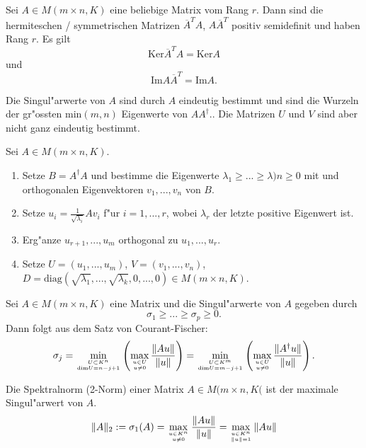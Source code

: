 \documentclass[9pt, a4paper, twocolumn, landscape]{article}
\begin{document}
\begin{lemma}
Sei $A \in M (m \times n, K)$ eine beliebige Matrix vom Rang $r$. Dann sind die hermiteschen / symmetrischen Matrizen $\overline{A}^T A$, $A\overline{A}^T$ positiv semidefinit und haben Rang $r$. Es gilt
$$
\mathrm{Ker} \overline{A}^T A = \mathrm{Ker} A
$$
und
$$
\mathrm{Im} A \overline{A}^T = \mathrm{Im} A.
$$
\end{lemma}



\begin{remark}
Die Singul"arwerte von $A$ sind durch $A$ eindeutig bestimmt und sind die Wurzeln der gr"ossten $\mathrm{min}(m, n)$ Eigenwerte von $AA^\dagger$.. Die Matrizen $U$ und $V$ sind aber nicht ganz eindeutig bestimmt.
\end{remark}

\begin{remark} 
Sei $A \in M(m \times n, K)$.
\begin{enumerate}
\item Setze $B = A^\dagger A$ und bestimme die Eigenwerte $\lambda_1 \geq ... \geq \lambda)n \geq 0$ mit und orthogonalen Eigenvektoren $v_1, ..., v_n$ von $B$.
\item Setze $u_i = \frac{1}{\sqrt{\lambda_i}} A v_i$ f"ur $i = 1, ..., r$, wobei $\lambda_r$ der letzte positive Eigenwert ist.
\item Erg"anze $u_{r+1}, ..., u_m$ orthogonal zu $u_1, ..., u_r$.
\item Setze $U = (u_1, ..., u_m)$, $V = (v_1, ..., v_n)$, $D = \mathrm{diag}(\sqrt{\lambda_1}, ..., \sqrt{\lambda_k}, 0, ..., 0) \in M(m \times n, K)$.
\end{enumerate}
\end{remark}


\begin{corollary}
Sei $A \in M(m \times n, K)$ eine Matrix und die Singul"arwerte von $A$ gegeben durch
$$
\sigma_1 \geq ... \geq \sigma_p \geq 0.
$$
Dann folgt aus dem Satz von Courant-Fischer:
$$
\sigma_j = \min\limits_{U \subset K^n \atop \mathrm{dim}U = n-j+1} \left(   \max\limits_{u \in U \atop u \neq 0} \frac{\|Au\|}{\|u\|}\right) = \min\limits_{U \subset K^m \atop \mathrm{dim} U = m - j + 1} \left(   \max\limits_{ u \in U \atop u \neq 0 } \frac{ \|A^\dagger u\| }{ \|u\| } \right).
$$
\end{corollary}


\begin{definition}
Die Spektralnorm (2-Norm) einer Matrix $A \in M(m \times n, K($ ist der maximale Singul"arwert von $A$.
$$
\|A\|_{2}:=\sigma_{1}(A)=\max _{u \in K^n \atop u \neq 0} \frac{\|A u\|}{\|u\|}=\max _{u \in K^n \atop \|u\|=1}\|A u\|
$$
\end{definition}
\end{document}
